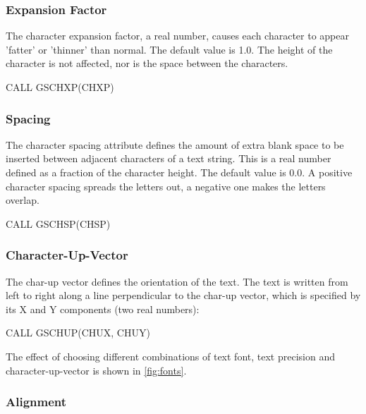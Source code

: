 \subsubsection{Expansion Factor}
 
The character expansion factor, a real number, causes each character to
appear 'fatter' or 'thinner' than normal. The default value is 1.0.
The height of the character is not affected, nor is the space
between the characters.
\begin{XMP}
CALL GSCHXP(CHXP)
\end{XMP}
\subsubsection{Spacing}
 
The character spacing attribute defines the amount of extra
blank space to be inserted between adjacent characters of a text string.
This is a real number defined as a fraction of the character height.
The default value is 0.0. A positive character spacing spreads the
letters out, a negative one makes the letters overlap.
\begin{XMP}
CALL GSCHSP(CHSP)
\end{XMP}
\subsubsection{Character-Up-Vector}
 
The char-up vector defines the orientation of the text.
The text is written from left to right along a line perpendicular to the
char-up vector, which is specified by its X and Y components
(two real numbers):
\begin{XMP}
CALL GSCHUP(CHUX, CHUY)
\end{XMP}
The effect of choosing different combinations of text font,
text precision and character-up-vector is shown in \ref{fig:fonts}.
\subsubsection{Alignment}
 
